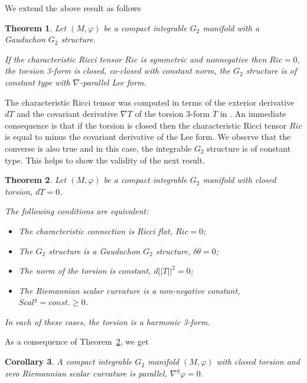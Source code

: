 \documentclass[10pt,british]{article}
\newtheorem{thrm}{Theorem}[section]
\newtheorem{cor}[thrm]{Corollary}
\def\sb {{\nabla}}
\def\LC{{\nabla^g}}
\def\p{{\varphi}}
\begin{document}
 
We extend the above result as follows
 \begin{thrm}\label{cooo}
Let $(M,\p)$ be a compact integrable $G_2$ manifold with a Gauduchon $G_2$ structure.  

If the characteristic Ricci tensor $Ric$ is symmetric and nonnegative then  $Ric=0$, the torsion 3-form is closed, co-closed with constant norm, the $G_2$ structure is of constant type with $\sb$-parallel Lee form.
\end{thrm}
 

 
 
 
 The characteristic Ricci tensor was computed in terms of the exterior derivative $dT$ and the covariant derivative $\sb T$ of the torsion 3-form $T$ in \cite[Theorem~5.1]{FI}. An immediate consequence is that if the torsion is closed then the characteristic Ricci tensor $Ric$ is equal to minus the covariant derivative of the Lee form. 
We observe   that the converse is also true and in this case, the integrable $G_2$ structure is of constant type.  This helps to show the validity of the next result.
\begin{thrm}\label{closTt}
Let $(M,\p)$ be a  compact  integrable $G_2$ manifold with closed torsion, $dT=0$. 

The following conditions are equivalent:
\begin{itemize}
\item[a).] The characteristic  connection  is Ricci flat, $Ric=0$;
\item[b).] The $G_2$ structure is a Gauduchon $G_2$ structure, $\delta\theta=0$;
\item[c).] The norm of the torsion is constant, $d||T||^2=0$;
\item[d).] The Riemannian scalar curvature is a non-negative constant, $Scal^g=const.\ge 0$.
\end{itemize}
In each of these cases,  the torsion is a harmonic 3-form.
\end{thrm}
As a consequence of Theorem~\ref{closTt}, we get
\begin{cor}\label{parallel}
A compact integrable $G_2$ manifold $(M,\p)$ with closed torsion and zero Riemannian scalar curvature is parallel, $\LC\p=0$.
\end{cor}
\end{document}

